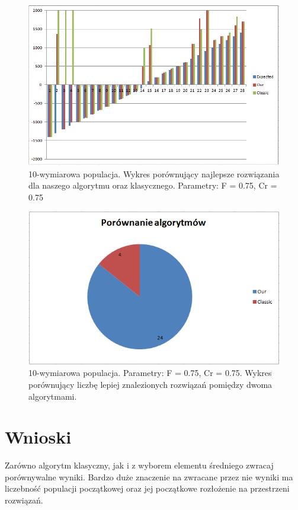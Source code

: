 \documentclass[a4paper]{article}
\begin{document}
\begin{figure}[!h]
\centering
\includegraphics[width=\textwidth]{F75Cr75L10chart.png}
\caption{10-wymiarowa populacja. Wykres porównujący najlepsze rozwiązania dla naszego algorytmu oraz klasycznego. Parametry: F = 0.75, Cr = 0.75}
\end{figure}

\begin{figure}[!h]
\centering
\includegraphics[width=\textwidth]{F75Cr75L10statystyka.png}
\caption{10-wymiarowa populacja. Parametry: F = 0.75, Cr = 0.75. Wykres porównujący liczbę lepiej znalezionych rozwiązań pomiędzy dwoma algorytmami.}
\end{figure}

\clearpage{}
\section{Wnioski}
Zarówno algorytm klasyczny, jak i z wyborem elementu średniego zwracaj porównywalne wyniki. Bardzo duże znaczenie na zwracane przez nie wyniki ma liczebność populacji początkowej oraz jej początkowe rozłożenie na przestrzeni rozwiązań. 
\end{document}
